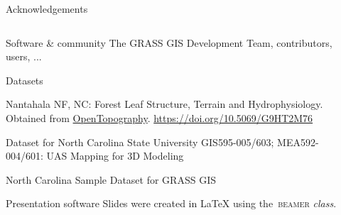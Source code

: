 \documentclass[xcolor={dvipsnames,usenames},beamer,aspectratio=169]{beamer}
\begin{document}
\begin{frame}{Acknowledgements}

\footnotesize

\begin{columns}
\begin{column}{0.6\textwidth}

\begin{block}{Software \& community}
The GRASS GIS Development Team, contributors, users, ...
\end{block}

\begin{block}{Datasets}


Nantahala NF, NC: Forest Leaf Structure, Terrain and Hydrophysiology.
Obtained from \href{http://www.opentopography.org/}{OpenTopography}.
\url{https://doi.org/10.5069/G9HT2M76}

Dataset for North Carolina State University GIS595-005/603; MEA592-004/601: UAS Mapping for 3D Modeling

North Carolina Sample Dataset for GRASS GIS
\end{block}

\begin{block}{Presentation software}
Slides were created in \textrm{\LaTeX{}} using the~\textrm{\textsc{beamer} \textit{class}}.
\end{block}


\end{column}
\begin{column}{0.3\textwidth}


\end{column}
\end{columns}
\end{frame}
\end{document}
